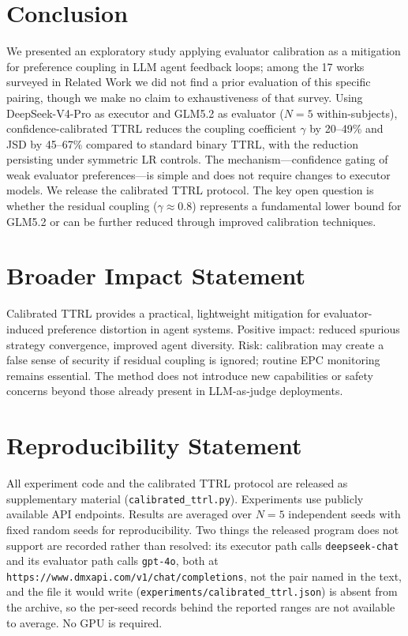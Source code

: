 \documentclass[11pt]{article}
\begin{document}
\section{Conclusion}

We presented an exploratory study applying evaluator calibration as a mitigation for preference coupling in LLM agent feedback loops; among the 17 works surveyed in Related Work we did not find a prior evaluation of this specific pairing, though we make no claim to exhaustiveness of that survey. Using DeepSeek-V4-Pro as executor and GLM5.2 as evaluator ($N{=}5$ within-subjects), confidence-calibrated TTRL reduces the coupling coefficient $\gamma$ by 20--49\% and JSD by 45--67\% compared to standard binary TTRL, with the reduction persisting under symmetric LR controls. The mechanism---confidence gating of weak evaluator preferences---is simple and does not require changes to executor models. We release the calibrated TTRL protocol. The key open question is whether the residual coupling ($\gamma \approx 0.8$) represents a fundamental lower bound for GLM5.2 or can be further reduced through improved calibration techniques.

\section*{Broader Impact Statement}

Calibrated TTRL provides a practical, lightweight mitigation for evaluator-induced preference distortion in agent systems. Positive impact: reduced spurious strategy convergence, improved agent diversity. Risk: calibration may create a false sense of security if residual coupling is ignored; routine EPC monitoring remains essential. The method does not introduce new capabilities or safety concerns beyond those already present in LLM-as-judge deployments.

\section*{Reproducibility Statement}

All experiment code and the calibrated TTRL protocol are released as supplementary material (\texttt{calibrated\_ttrl.py}). Experiments use publicly available API endpoints. Results are averaged over $N{=}5$ independent seeds with fixed random seeds for reproducibility. Two things the released program does not support are recorded rather than resolved: its executor path calls \texttt{deepseek-chat} and its evaluator path calls \texttt{gpt-4o}, both at \texttt{https://www.dmxapi.com/v1/chat/completions}, not the pair named in the text, and the file it would write (\texttt{experiments/calibrated\_ttrl.json}) is absent from the archive, so the per-seed records behind the reported ranges are not available to average. No GPU is required.
\end{document}
